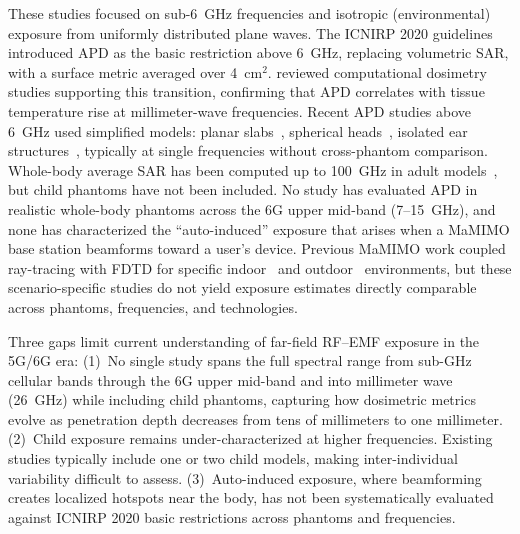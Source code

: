 \documentclass{iopjournal}
\begin{document}
These studies focused on sub-6~GHz frequencies and isotropic (environmental) exposure from uniformly distributed plane waves.
The \gls{ICNIRP} 2020 guidelines~\citep{icnirp2020} introduced \gls{APD} as the basic restriction above 6~GHz, replacing volumetric \gls{SAR}, with a surface metric averaged over 4~cm$^2$.
\citet{hirata2021review} reviewed computational dosimetry studies supporting this transition, confirming that APD correlates with tissue temperature rise at millimeter-wave frequencies.
Recent \gls{APD} studies above 6~GHz used simplified models: planar slabs~\citep{nakae2020skin}, spherical heads~\citep{lojic2022spherical}, isolated ear structures~\citep{lojic2023ear}, typically at single frequencies without cross-phantom comparison.
Whole-body average SAR has been computed up to 100~GHz in adult models~\citep{kodera2024wbasar}, but child phantoms have not been included.
No study has evaluated \gls{APD} in realistic whole-body phantoms across the 6G upper mid-band (7--15~GHz), and none has characterized the ``auto-induced'' exposure that arises when a \gls{MaMIMO} base station beamforms toward a user's device.
Previous \gls{MaMIMO} work coupled ray-tracing with \gls{FDTD} for specific indoor~\citep{shikhantsov2020massive,wydaeghe2022realistic} and outdoor~\citep{wydaeghe2025outdoor} environments, but these scenario-specific studies do not yield exposure estimates directly comparable across phantoms, frequencies, and technologies.

Three gaps limit current understanding of far-field \gls{RF}--\gls{EMF} exposure in the 5G/6G era:
(1)~No single study spans the full spectral range from sub-GHz cellular bands through the 6G upper mid-band and into millimeter wave (26~GHz) while including child phantoms, capturing how dosimetric metrics evolve as penetration depth decreases from tens of millimeters to one millimeter.
(2)~Child exposure remains under-characterized at higher frequencies. Existing studies typically include one or two child models, making inter-individual variability difficult to assess.
(3)~Auto-induced exposure, where beamforming creates localized hotspots near the body, has not been systematically evaluated against \gls{ICNIRP} 2020 basic restrictions across phantoms and frequencies.
\end{document}
